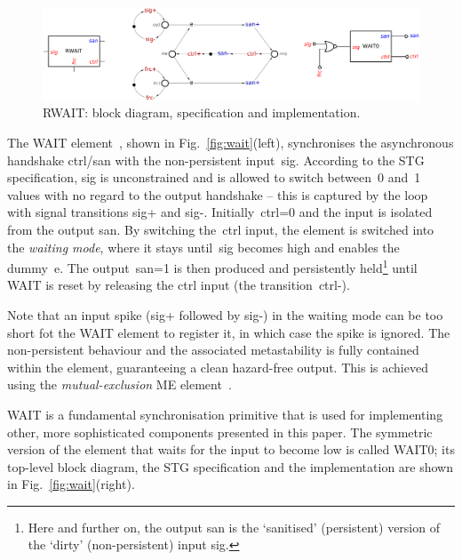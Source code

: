 \documentclass[conference]{IEEEtran}
\begin{document}
\begin{figure}
\begin{center}
    \includegraphics[scale=0.23]{fig/RWAIT.pdf}
    \vspace{-1mm}
    \caption{\textsf{RWAIT}: block diagram, specification and implementation.}
    \label{fig:rwait}
    \vspace{-5mm}
\end{center}
\end{figure}

The \textsf{WAIT} element~\cite{2015_sokolov_multiphase}, shown in Fig.~\ref{fig:wait}(left),
synchronises the asynchronous handshake \textsf{ctrl/san} with the non-persistent
input~\textsf{sig}. According to the STG specification, \textsf{sig} is unconstrained and
is allowed to switch between~0 and~1 values with no regard to the output handshake -- this
is captured by the loop with signal transitions \textsf{sig+} and \textsf{sig-}.
Initially~\textsf{ctrl=0} and the input is isolated from the output \textsf{san}.
By switching the~\textsf{ctrl} input, the element is switched into the \emph{waiting mode},
where it stays until~\textsf{sig} becomes high and enables the
dummy~\textsf{e}. The output~\textsf{san=1} is then produced and persistently
held\footnote{Here and further on, the output \textsf{san}
is the `sanitised' (persistent) version of the `dirty' (non-persistent) input \textsf{sig}.}
until \textsf{WAIT} is reset by releasing the \textsf{ctrl} input (the transition~\textsf{ctrl-}).

Note that an input spike (\textsf{sig+} followed by \textsf{sig-}) in the waiting
mode can be too short fot the \textsf{WAIT} element to register it, in which case the spike
is ignored. The non-persistent behaviour and the associated metastability is fully contained
within the element, guaranteeing a clean hazard-free output. This is achieved using the
\emph{mutual-exclusion} \textsf{ME} element~\cite{2008_kinniment_synchronisation}.

\textsf{WAIT} is a fundamental synchronisation primitive that is used for
implementing other, more sophisticated components presented in this paper.
The symmetric version of the element that waits for the input to become low is
called \textsf{WAIT0}; its top-level block diagram, the STG specification and
the implementation are shown in Fig.~\ref{fig:wait}(right).
\end{document}
